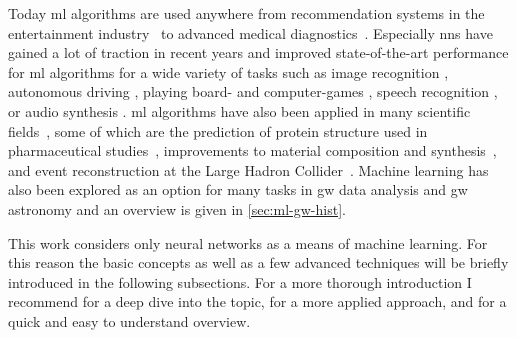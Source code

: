 Today \acrshort{ml} algorithms are used anywhere from recommendation systems in the entertainment industry~\cite{Steck:2021aaa} to advanced medical diagnostics~\cite{Esteva:2019aaa}. Especially \acrshort{nn}s have gained a lot of traction in recent years and improved state-of-the-art performance for \acrshort{ml} algorithms for a wide variety of tasks such as image recognition \cite{krizhevsky:2012, Szegedy:2015, Russakovsky:2015aaa}, autonomous driving \cite{Sallab:2017}, playing board- \cite{Silver:2016} and computer-games \cite{openai:2019}, speech recognition \cite{Hinton:2012}, or audio synthesis \cite{Oord:2016wav}. \acrshort{ml} algorithms have also been applied in many scientific fields~\cite{Deiana:2021niw}, some of which are the prediction of protein structure used in pharmaceutical studies~\cite{Alquraishi:2021aaa, Jumper:2021aaa}, improvements to material composition and synthesis~\cite{Butler:2018aaa}, and event reconstruction at the Large Hadron Collider~\cite{Gray:2020mcm}. Machine learning has also been explored as an option for many tasks in \acrshort{gw} data analysis and \acrshort{gw} astronomy and an overview is given in \autoref{sec:ml-gw-hist}.

This work considers only neural networks as a means of machine learning. For this reason the basic concepts as well as a few advanced techniques will be briefly introduced in the following subsections. For a more thorough introduction I recommend \cite{Goodfellow:2016:DNN} for a deep dive into the topic, \cite{Geron:2017aaa} for a more applied approach, and \cite{Nielsen:2015:DNN} for a quick and easy to understand overview.

